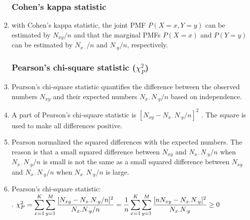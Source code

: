 \begin{enumerate}
\subsubsection{Cohen’s kappa statistic}

    \item with Cohen’s kappa statistic, the joint PMF $P(X = x, Y = y)$ can be estimated by $N_{x y} /n$ and that the marginal PMFs $P(X = x)$ and $P(Y = y)$ can be estimated by $N_{x\cdot }/n$ and $N_{\cdot y} /n$, respectively.
    \hfill \cite{statistics/book/Statistics-for-Data-Scientists/Maurits-Kaptein}

\subsubsection{Pearson’s chi-square statistic ($\chi_P^2$)}

    \item Pearson’s chi-square statistic quantifies the difference between the observed numbers $N_{x y}$ and their expected numbers $N_{x\cdot } N_{\cdot y} /n$ based on independence.
    \hfill \cite{statistics/book/Statistics-for-Data-Scientists/Maurits-Kaptein}

    \item  A part of Pearson’s chi-square statistic is $[N_{x y} - N_{x\cdot} N_{\cdot y} /n]^2$ . The square is used  to make all differences positive.
    \hfill \cite{statistics/book/Statistics-for-Data-Scientists/Maurits-Kaptein}

    \item Pearson normalized the squared differences with the expected numbers. 
    The reason is that a small squared difference between $N_{x y}$ and $N_{x\cdot} N_{\cdot y} /n$ when $N_{x\cdot} N_{\cdot y} /n$ is small is not the same as a small squared difference between $N_{x y}$ and $N_{x\cdot} N_{\cdot y} /n$ when $N_{x\cdot} N_{\cdot y} /n$ is large. 
    \hfill \cite{statistics/book/Statistics-for-Data-Scientists/Maurits-Kaptein}

    \item Pearson’s chi-square statistic:
    \hfill \cite{statistics/book/Statistics-for-Data-Scientists/Maurits-Kaptein}
    \\
    .\hfill
    $
        \chi^2_P 
        = \displaystyle\sum^K_{x=1} \displaystyle\sum^M_ {y=1} \dfrac{[N_{x y} - N_{x\cdot} N_{\cdot y} /n]^2}{N_{x\cdot} N_{\cdot y} /n} 
        = \dfrac{1}{n} \displaystyle\sum^K_{x=1} \displaystyle\sum^M_ {y=1} \dfrac{[n N_{x y} - N_{x\cdot} N_{\cdot y} ]^2} {N_{x\cdot} N_{\cdot y}}
        \geq 0
    $
    \hfill \cite{statistics/book/Statistics-for-Data-Scientists/Maurits-Kaptein}


\end{enumerate}
